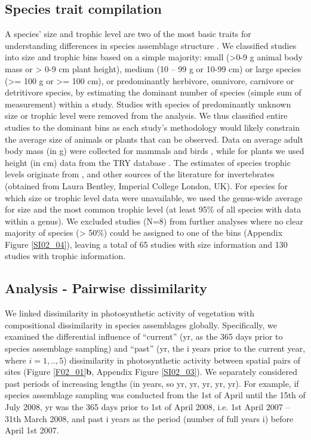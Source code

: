 \subsection{Species trait compilation}
\label{C02_0203}
A species’ size and trophic level are two of the most basic traits for understanding differences in species assemblage structure \citep{Speakman2005,Terborgh2015}. We classified studies into size and trophic bins based on a simple majority: small (>0-9 g animal body mass or > 0-9 cm plant height), medium (10 – 99 g or 10-99 cm) or large species (>= 100 g or >= 100 cm), or predominantly herbivore, omnivore, carnivore or detritivore species, by estimating the dominant number of species (simple sum of measurement) within a study. Studies with species of predominantly unknown size or trophic level were removed from the analysis. We thus classified entire studies to the dominant bins as each study’s methodology would likely constrain the average size of animals or plants that can be observed. Data on average adult body mass (in g) were collected for mammals \citep{Jones2009} and birds \citep{Myhrvold2015}, while for plants we used height (in cm) data from the TRY database \citep{Kattge2011}. The estimates of species trophic levels originate from \cite{Kissling2014}, \cite{Wilman2014} and other sources of the literature for invertebrates (obtained from Laura Bentley, Imperial College London, UK). For species for which size or trophic level data were unavailable, we used the genus-wide average for size and the most common trophic level (at least 95\% of all species with data within a genus). We excluded studies (N=8) from further analyses where no clear majority of species (> 50\%) could be assigned to one of the bins (Appendix Figure \ref{SI02_04}), leaving a total of 65 studies with size information and 130 studies with trophic information. 

\subsection{Analysis - Pairwise dissimilarity}
\label{C02_0204}
We linked dissimilarity in photosynthetic activity of vegetation with compositional dissimilarity in species assemblages globally. Specifically, we examined the differential influence of “current” (yr, as the 365 days prior to species assemblage sampling) and “past” (yr, the i years prior to the current year, where $i = 1,..,5$) dissimilarity in photosynthetic activity between spatial pairs of sites (Figure \ref{F02_01}\textbf{b}, Appendix Figure \ref{SI02_03}). We separately considered past periods of increasing lengths (in years, so yr, yr, yr, yr, yr). For example, if species assemblage sampling was conducted from the 1st of April until the 15th of July 2008, yr was the 365 days prior to 1st of April 2008, i.e. 1st April 2007 – 31th March 2008, and past i years as the period (number of full years i) before April 1st 2007.

